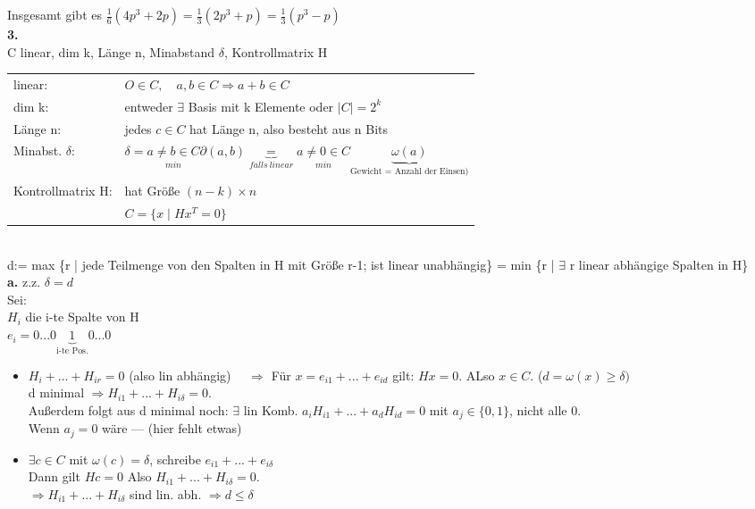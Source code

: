 \documentclass{article} %
\begin{document}
Insgesamt gibt es $\frac{1}{6}(4p^3+2p) = \frac{1}{3} (2p^3+p) = \frac{1}{3}(p^3-p)$ \\ \newline
\textbf{3.} \\
C linear, dim k, Länge n, Minabstand $\delta$, Kontrollmatrix H  \\
\begin{tabular}{ll}
    linear: & $O \in C, \quad a,b \in C \Rightarrow a+b \in C$ \\
    dim k: &  entweder $\exists$ Basis mit k Elemente oder $|C| = 2^k$ \\
    Länge n: & jedes $c \in C$ hat Länge n, also besteht aus n Bits \\
    Minabst. $\delta$: & $\delta = \underset{min}{a \neq b \in C} \partial (a,b) \underbrace{=}_{falls \ linear} \underset{min}{a \neq 0 \in C} \underbrace{\omega(a)}_{\text{Gewicht = Anzahl der Einsen)}}$  \\
    Kontrollmatrix H: & hat Größe $(n-k) \times n$ \\
    & $C = \{x \mid H x^T = 0\}$
\end{tabular} \\ 
d:= max \{r | jede Teilmenge von den Spalten in H mit Größe r-1; ist linear unabhängig\} = min \{r | $\exists$ r linear abhängige Spalten in H\} \\
\textbf{a.} z.z. $\delta = d$  \\
Sei: \\
$H_i$ die i-te Spalte von H \\
$e_i = 0 ... 0 \underbrace{1}_{\text{i-te Pos.}} 0 ... 0 $ 
\begin{itemize}
    \item $H_i + ... + H_{ir} = 0 $ (also lin abhängig) $ \quad \Rightarrow $ Für $x = e_{i1} + ... + e_{i d}$ gilt: $Hx = 0$. ALso $x \in C$. ($d = \omega (x) \geq \delta)$ \\
    d minimal $\Rightarrow H_{i1} + ... + H_{i \delta} = 0$. \\
    Außerdem folgt aus d minimal noch: $\exists $ lin Komb. $a_i H_{i1} + ... + a_d H_{i d} = 0$ mit $a_j \in \{0,1\}$, nicht alle 0. \\
    Wenn $a_j = 0$ wäre --- (hier fehlt etwas)
    \item $\exists c \in C$ mit $\omega (c) = \delta $, schreibe $e_{i1} + ... + e_{i \delta}$ \\
    Dann gilt $Hc = 0$ Also $H_{i1} + ... + H_{i \delta} = 0$. \\
    $\Rightarrow H_{i1} + ... + H_{i \delta}$ sind lin. abh. $\Rightarrow d \leq \delta$ 
\end{itemize}
\end{document}
